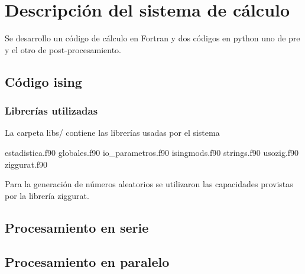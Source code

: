 
\section{Descripci\'on del sistema de c\'alculo}


Se desarrollo un c\'odigo de c\'alculo en Fortran y dos c\'odigos
en python uno  de pre y el otro de post-procesamiento.


\subsection{C\'odigo ising}

\subsubsection{Librer\'ias utilizadas}

La carpeta libs/ contiene las librer\'ias usadas por el sistema

estadistica.f90  globales.f90  io\_parametros.f90  isingmods.f90  strings.f90  usozig.f90  ziggurat.f90


Para la generaci\'on de n\'umeros aleatorios se utilizaron
las capacidades provistas por la librer\'ia ziggurat. 



\subsection{Procesamiento en serie}

\subsection{Procesamiento en paralelo}
